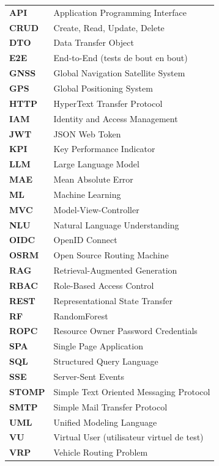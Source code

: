 \documentclass[12pt,a4paper]{report}
\begin{document}
\begin{tabularx}{\textwidth}{lX}
  \textbf{API}     & Application Programming Interface \\
  \textbf{CRUD}    & Create, Read, Update, Delete \\
  \textbf{DTO}     & Data Transfer Object \\
  \textbf{E2E}     & End-to-End (tests de bout en bout) \\
  \textbf{GNSS}    & Global Navigation Satellite System \\
  \textbf{GPS}     & Global Positioning System \\
  \textbf{HTTP}    & HyperText Transfer Protocol \\
  \textbf{IAM}     & Identity and Access Management \\
  \textbf{JWT}     & JSON Web Token \\
  \textbf{KPI}     & Key Performance Indicator \\
  \textbf{LLM}     & Large Language Model \\
  \textbf{MAE}     & Mean Absolute Error \\
  \textbf{ML}      & Machine Learning \\
  \textbf{MVC}     & Model-View-Controller \\
  \textbf{NLU}     & Natural Language Understanding \\
  \textbf{OIDC}    & OpenID Connect \\
  \textbf{OSRM}    & Open Source Routing Machine \\
  \textbf{RAG}     & Retrieval-Augmented Generation \\
  \textbf{RBAC}    & Role-Based Access Control \\
  \textbf{REST}    & Representational State Transfer \\
  \textbf{RF}      & RandomForest \\
  \textbf{ROPC}    & Resource Owner Password Credentials \\
  \textbf{SPA}     & Single Page Application \\
  \textbf{SQL}     & Structured Query Language \\
  \textbf{SSE}     & Server-Sent Events \\
  \textbf{STOMP}   & Simple Text Oriented Messaging Protocol \\
  \textbf{SMTP}    & Simple Mail Transfer Protocol \\
  \textbf{UML}     & Unified Modeling Language \\
  \textbf{VU}      & Virtual User (utilisateur virtuel de test) \\
  \textbf{VRP}     & Vehicle Routing Problem \\
\end{tabularx}
\end{document}

